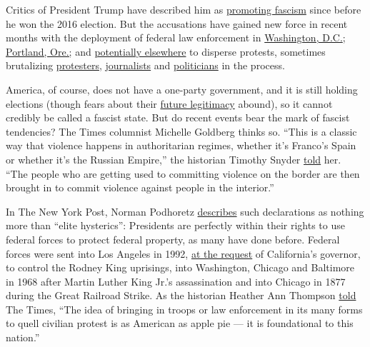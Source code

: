 Critics of President Trump have described him as
\href{https://www.washingtonpost.com/opinions/this-is-how-fascism-comes-to-america/2016/05/17/c4e32c58-1c47-11e6-8c7b-6931e66333e7_story.html?hpid=hp_no-name_opinion-card-b\%3Ahomepage\%2Fstory}{promoting
fascism} since before he won the 2016 election. But the accusations have
gained new force in recent months with the deployment of federal law
enforcement in
\href{https://www.nytimes3xbfgragh.onion/2020/06/02/us/politics/trump-walk-lafayette-square.html}{Washington,
D.C.};
\href{https://www.nytimes3xbfgragh.onion/2020/07/17/us/portland-protests.html}{Portland,
Ore.;} and
\href{https://www.nytimes3xbfgragh.onion/2020/07/20/us/politics/trump-chicago-portland-federal-agents.html}{potentially
elsewhere} to disperse protests, sometimes brutalizing
\href{https://www.nytimes3xbfgragh.onion/video/us/100000007243995/portland-protests-federal-government.html}{protesters},
\href{https://www.businessinsider.com/portland-journalist-recounts-being-shot-in-the-face-by-police-2020-7}{journalists}
and
\href{https://www.nytimes3xbfgragh.onion/2020/07/23/us/portland-protest-tear-gas-mayor.html?action=click\&module=Top\%20Stories\&pgtype=Homepage}{politicians}
in the process.

America, of course, does not have a one-party government, and it is
still holding elections (though fears about their
\href{https://www.nytimes3xbfgragh.onion/2020/07/25/us/politics/2020-election-voter-fraud-interference.html}{future
legitimacy} abound), so it cannot credibly be called a fascist state.
But do recent events bear the mark of fascist tendencies? The Times
columnist Michelle Goldberg thinks so. ``This is a classic way that
violence happens in authoritarian regimes, whether it's Franco's Spain
or whether it's the Russian Empire,'' the historian Timothy Snyder
\href{https://www.nytimes3xbfgragh.onion/2020/07/20/opinion/portland-protests-trump.html}{told}
her. ``The people who are getting used to committing violence on the
border are then brought in to commit violence against people in the
interior.''

In The New York Post, Norman Podhoretz
\href{https://nypost.com/2020/07/23/its-not-fascism-to-protect-federal-property-from-riots-revolutionaries/}{describes}
such declarations as nothing more than ``elite hysterics'': Presidents
are perfectly within their rights to use federal forces to protect
federal property, as many have done before. Federal forces were sent
into Los Angeles in 1992,
\href{https://www.latimes.com/politics/story/2020-06-01/insurrection-act-allow-trump-send-troops-to-state}{at
the request} of California's governor, to control the Rodney King
uprisings, into Washington, Chicago and Baltimore in 1968 after Martin
Luther King Jr.'s assassination and into Chicago in 1877 during the
Great Railroad Strike. As the historian Heather Ann Thompson
\href{https://www.nytimes3xbfgragh.onion/2020/07/23/upshot/trump-portland.html}{told}
The Times, ``The idea of bringing in troops or law enforcement in its
many forms to quell civilian protest is as American as apple pie --- it
is foundational to this nation.''

